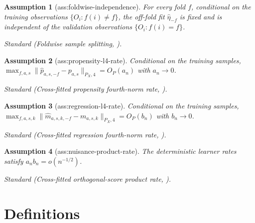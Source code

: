\documentclass{article}
\newtheorem{assumption}{Assumption}
\begin{document}
\begin{assumption}[ass:foldwise-independence]\label{ass:foldwise-independence}
For every fold \(f\), conditional on the training observations \(\{O_i:f(i)\ne f\}\), the off-fold fit \(\widehat\eta_{-f}\) is fixed and is independent of the validation observations \(\{O_i:f(i)=f\}\).
\par\smallskip\noindent\emph{Standard} (Foldwise sample splitting, \cite{ChernozhukovEtAl2018}).
\end{assumption}

\begin{assumption}[ass:propensity-l4-rate]\label{ass:propensity-l4-rate}
Conditional on the training samples, \(\max_{f,a,s}\|\widehat p_{a,s,-f}-p_{a,s}\|_{P_X,4}=O_P(a_n)\) with \(a_n\to0\).
\par\smallskip\noindent\emph{Standard} (Cross-fitted propensity fourth-norm rate, \cite{ChernozhukovEtAl2018}).
\end{assumption}

\begin{assumption}[ass:regression-l4-rate]\label{ass:regression-l4-rate}
Conditional on the training samples, \(\max_{f,a,s,k}\|\widehat m_{a,s,k,-f}-m_{a,s,k}\|_{P_X,4}=O_P(b_n)\) with \(b_n\to0\).
\par\smallskip\noindent\emph{Standard} (Cross-fitted regression fourth-norm rate, \cite{ChernozhukovEtAl2018}).
\end{assumption}

\begin{assumption}[ass:nuisance-product-rate]\label{ass:nuisance-product-rate}
The deterministic learner rates satisfy \(a_nb_n=o(n^{-1/2})\).
\par\smallskip\noindent\emph{Standard} (Cross-fitted orthogonal-score product rate, \cite{ChernozhukovEtAl2018}).
\end{assumption}

\section{Definitions}
\end{document}
